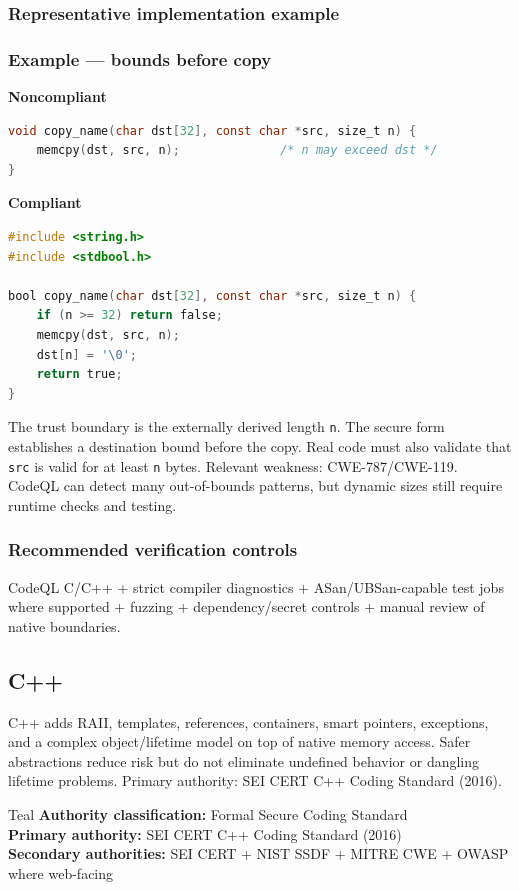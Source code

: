 \documentclass[10pt,letterpaper]{article}
\newcommand{\code}[1]{\texttt{\small #1}}
\begin{document}
\subsubsection*{Representative implementation example}
\subsubsection*{Example --- bounds before copy}

\textbf{Noncompliant}\par
\begin{lstlisting}[language={C}]
void copy_name(char dst[32], const char *src, size_t n) {
    memcpy(dst, src, n);              /* n may exceed dst */
}
\end{lstlisting}

\textbf{Compliant}\par
\begin{lstlisting}[language={C}]
#include <string.h>
#include <stdbool.h>

bool copy_name(char dst[32], const char *src, size_t n) {
    if (n >= 32) return false;
    memcpy(dst, src, n);
    dst[n] = '\0';
    return true;
}
\end{lstlisting}

The trust boundary is the externally derived length \code{n}. The secure form establishes a destination bound before the copy. Real code must also validate that \code{src} is valid for at least \code{n} bytes. Relevant weakness: CWE-787/CWE-119. CodeQL can detect many out-of-bounds patterns, but dynamic sizes still require runtime checks and testing.\par
\subsubsection*{Recommended verification controls}
CodeQL C/C++ + strict compiler diagnostics + ASan/UBSan-capable test jobs where supported + fuzzing + dependency/secret controls + manual review of native boundaries.
\clearpage
\subsection{C++}
C++ adds RAII, templates, references, containers, smart pointers, exceptions, and a complex object/lifetime model on top of native memory access. Safer abstractions reduce risk but do not eliminate undefined behavior or dangling lifetime problems. Primary authority: SEI CERT C++ Coding Standard (2016).
\begin{callout}{Teal}
\textbf{Authority classification:} Formal Secure Coding Standard\\
\textbf{Primary authority:} SEI CERT C++ Coding Standard (2016)\\
\textbf{Secondary authorities:} SEI CERT + NIST SSDF + MITRE CWE + OWASP where web-facing
\end{callout}
\end{document}
